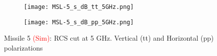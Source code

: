   \begin{figure}[htbp]
    \centering
    \begin{subfigure}{.5\textwidth}
      \centering
      \texttt{[image: MSL-5\_s\_dB\_tt\_5GHz.png]}
    \end{subfigure}%
    \begin{subfigure}{.5\textwidth}
      \centering
      \texttt{[image: MSL-5\_s\_dB\_pp\_5GHz.png]}
    \end{subfigure}
    \caption{Missile 5 \textcolor{red}{(Sim)}:  RCS cut at 5 GHz. Vertical (tt) and Horizontal (pp) polarizations }
    \label{fig:ns5}
  \end{figure}
